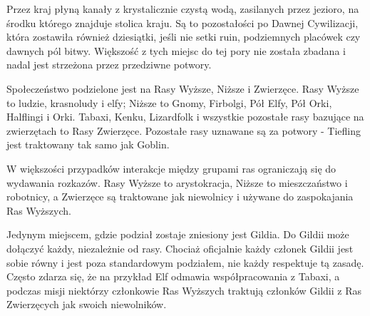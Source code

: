 Przez kraj płyną kanały z krystalicznie czystą wodą, zasilanych przez jezioro,
na środku którego znajduje stolica kraju. Są to pozostałości po Dawnej
Cywilizacji, która zostawiła również dziesiątki, jeśli nie setki ruin,
podziemnych placówek czy dawnych pól bitwy. Większość z tych miejsc do tej pory
nie została zbadana i nadal jest strzeżona przez przedziwne potwory.

Społeczeństwo podzielone jest na Rasy Wyższe, Niższe i Zwierzęce. Rasy Wyższe to
ludzie, krasnoludy i elfy; Niższe to Gnomy, Firbolgi, Pół Elfy, Pół Orki,
Halflingi i Orki. Tabaxi, Kenku, Lizardfolk i wszystkie pozostałe rasy bazujące
na zwierzętach to Rasy Zwierzęce. Pozostałe rasy uznawane są za potwory -
Tiefling jest traktowany tak samo jak Goblin.

W większości przypadków interakcje między grupami ras ograniczają się do
wydawania rozkazów. Rasy Wyższe to arystokracja, Niższe to mieszczaństwo i
robotnicy, a Zwierzęce są traktowane jak niewolnicy i używane do zaspokajania
Ras Wyższych.

Jedynym miejscem, gdzie podział zostaje zniesiony jest Gildia. Do Gildii może
dołączyć każdy, niezależnie od rasy. Chociaż oficjalnie każdy członek Gildii
jest sobie równy i jest poza standardowym podziałem, nie każdy respektuje tą
zasadę. Często zdarza się, że na przykład Elf odmawia współpracowania z Tabaxi,
a podczas misji niektórzy członkowie Ras Wyższych traktują członków Gildii z Ras
Zwierzęcych jak swoich niewolników.
